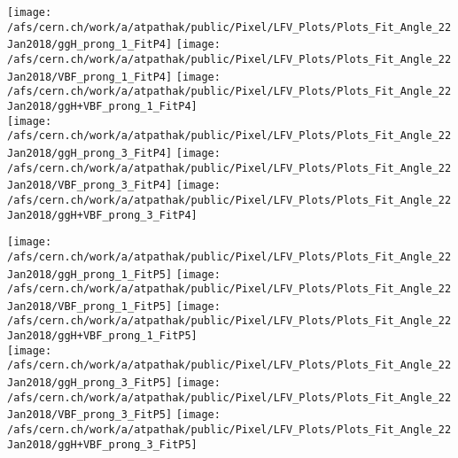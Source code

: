 \documentclass{beamer}
\begin{document}
\begin{frame}
\begin{normalsize}
\begin{center}
\texttt{[image: /afs/cern.ch/work/a/atpathak/public/Pixel/LFV\_Plots/Plots\_Fit\_Angle\_22Jan2018/ggH\_prong\_1\_FitP4]}
\texttt{[image: /afs/cern.ch/work/a/atpathak/public/Pixel/LFV\_Plots/Plots\_Fit\_Angle\_22Jan2018/VBF\_prong\_1\_FitP4]}
\texttt{[image: /afs/cern.ch/work/a/atpathak/public/Pixel/LFV\_Plots/Plots\_Fit\_Angle\_22Jan2018/ggH+VBF\_prong\_1\_FitP4]}\\
\texttt{[image: /afs/cern.ch/work/a/atpathak/public/Pixel/LFV\_Plots/Plots\_Fit\_Angle\_22Jan2018/ggH\_prong\_3\_FitP4]}
\texttt{[image: /afs/cern.ch/work/a/atpathak/public/Pixel/LFV\_Plots/Plots\_Fit\_Angle\_22Jan2018/VBF\_prong\_3\_FitP4]}
\texttt{[image: /afs/cern.ch/work/a/atpathak/public/Pixel/LFV\_Plots/Plots\_Fit\_Angle\_22Jan2018/ggH+VBF\_prong\_3\_FitP4]}
\end{center}
\end{normalsize}
\end {frame}
\begin{frame}
\begin{normalsize}
\begin{center}
\texttt{[image: /afs/cern.ch/work/a/atpathak/public/Pixel/LFV\_Plots/Plots\_Fit\_Angle\_22Jan2018/ggH\_prong\_1\_FitP5]}
\texttt{[image: /afs/cern.ch/work/a/atpathak/public/Pixel/LFV\_Plots/Plots\_Fit\_Angle\_22Jan2018/VBF\_prong\_1\_FitP5]}
\texttt{[image: /afs/cern.ch/work/a/atpathak/public/Pixel/LFV\_Plots/Plots\_Fit\_Angle\_22Jan2018/ggH+VBF\_prong\_1\_FitP5]}\\
\texttt{[image: /afs/cern.ch/work/a/atpathak/public/Pixel/LFV\_Plots/Plots\_Fit\_Angle\_22Jan2018/ggH\_prong\_3\_FitP5]}
\texttt{[image: /afs/cern.ch/work/a/atpathak/public/Pixel/LFV\_Plots/Plots\_Fit\_Angle\_22Jan2018/VBF\_prong\_3\_FitP5]}
\texttt{[image: /afs/cern.ch/work/a/atpathak/public/Pixel/LFV\_Plots/Plots\_Fit\_Angle\_22Jan2018/ggH+VBF\_prong\_3\_FitP5]}
\end{center}
\end{normalsize}
\end {frame}
\end{document}
